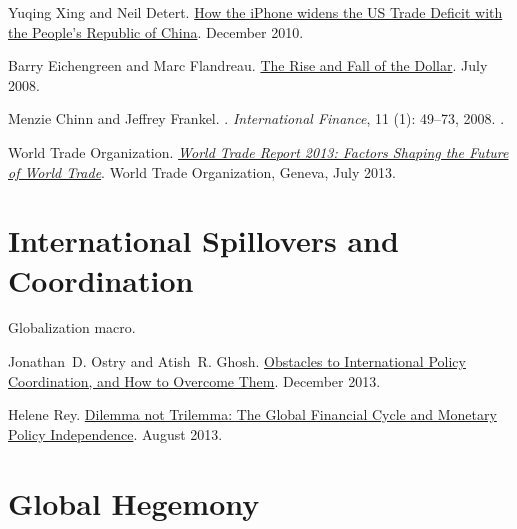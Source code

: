 \documentclass[%
 11pt%
]{article}
\begin{document}
Yuqing Xing and Neil Detert.
\newblock \href{http://www.adbi.org/working-paper/2010/12/14/4236.iphone.widens.us.trade.deficit.prc/}{How the iPhone widens the US Trade Deficit with the People’s
  Republic of China}.
\newblock December 2010.
\medskip

Barry Eichengreen and Marc Flandreau.
\newblock \href{http://www.nber.org/papers/w14154}{The Rise and Fall of the Dollar}.
\newblock July 2008.
\medskip

Menzie Chinn and Jeffrey Frankel.
.
\newblock \emph{International Finance}, 11 (1): 49--73, 2008.
.
\medskip

{World Trade Organization}.
\newblock \href{http://www.wto.org/english/res\_e/publications\_e/wtr13\_e.htm}\emph{{World Trade Report 2013: Factors Shaping the Future of World
  Trade}}.
\newblock World Trade Organization, Geneva, July 2013.
\medskip

\section{International Spillovers and Coordination}

Globalization macro.

\nocite{Ostry-J-Ghosh-A-Obstacles-to-International-Policy-Coordination-2013}
\nocite{Rey-Helene-Dilemma-not-Trilemma-2013}

\bigskip
Jonathan~D. Ostry and Atish~R. Ghosh.
\newblock \href{https://www.imf.org/external/pubs/ft/sdn/2013/sdn1311.pdf}{Obstacles to International Policy Coordination, and How to Overcome
  Them}.
\newblock December 2013.
\medskip

Helene Rey.
\newblock \href{http://www.kc.frb.org/publicat/sympos/2013/2013Rey.pdf}{Dilemma not Trilemma: The Global Financial Cycle and Monetary Policy
  Independence}.
\newblock August 2013.
\medskip


\section{Global Hegemony}
\end{document}
